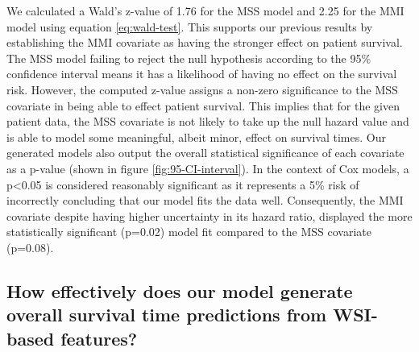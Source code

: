 \documentclass{l4proj}
\begin{document}
We calculated a Wald's z-value of 1.76 for the MSS model and 2.25 for the MMI model using equation \ref{eq:wald-test}. This supports our previous results by establishing the MMI covariate as having the stronger effect on patient survival. The MSS model failing to reject the null hypothesis according to the 95\% confidence interval means it has a likelihood of having no effect on the survival risk. However, the computed z-value assigns a non-zero significance to the MSS covariate in being able to effect patient survival. This implies that for the given patient data, the MSS covariate is not likely to take up the null hazard value and is able to model some meaningful, albeit minor, effect on survival times. Our generated models also output the overall statistical significance of each covariate as a p-value (shown in figure \ref{fig:95-CI-interval}). In the context of Cox models, a p<0.05 is considered reasonably significant as it represents a 5\% risk of incorrectly concluding that our model fits the data well. Consequently, the MMI covariate despite having higher uncertainty in its hazard ratio, displayed the more statistically significant (p=0.02) model fit compared to the MSS covariate (p=0.08).

\subsection{How effectively does our model generate overall survival time predictions from WSI-based features?}
\end{document}
